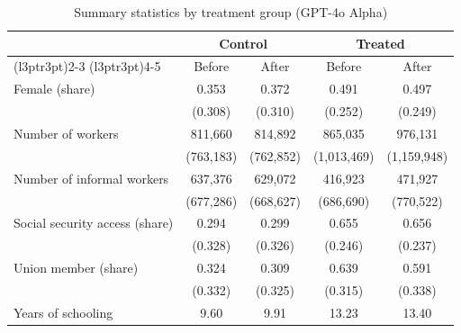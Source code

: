 \begin{table}[H]
  \centering
  \caption{\label{tab:sumstats_exposure_alpha_gpt}Summary statistics by treatment group (GPT-4o Alpha)}
  \centering
  \begin{threeparttable}
    \begin{tabular}[t]{lcccc}
      \toprule
      \multicolumn{1}{c}{ }          & \multicolumn{2}{c}{Control} & \multicolumn{2}{c}{Treated}                             \\
      \cmidrule(l{3pt}r{3pt}){2-3} \cmidrule(l{3pt}r{3pt}){4-5}
                                     & Before                      & After                       & Before      & After       \\
      \midrule
      Female (share)                 & 0.353                       & 0.372                       & 0.491       & 0.497       \\
                                     & (0.308)                     & (0.310)                     & (0.252)     & (0.249)     \\
      \addlinespace[3pt]
      Number of workers              & 811,660                     & 814,892                     & 865,035     & 976,131     \\
                                     & (763,183)                   & (762,852)                   & (1,013,469) & (1,159,948) \\
      \addlinespace[3pt]
      Number of informal workers     & 637,376                     & 629,072                     & 416,923     & 471,927     \\
                                     & (677,286)                   & (668,627)                   & (686,690)   & (770,522)   \\
      \addlinespace[3pt]
      Social security access (share) & 0.294                       & 0.299                       & 0.655       & 0.656       \\
                                     & (0.328)                     & (0.326)                     & (0.246)     & (0.237)     \\
      \addlinespace[3pt]
      Union member (share)           & 0.324                       & 0.309                       & 0.639       & 0.591       \\
                                     & (0.332)                     & (0.325)                     & (0.315)     & (0.338)     \\
      \addlinespace[3pt]
      Years of schooling             & 9.60                        & 9.91                        & 13.23       & 13.40       \\

\end{tabular}
\end{threeparttable}
\end{table}
